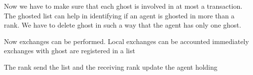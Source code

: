 \documentclass{article}
\begin{document}
Now we have to make sure that each ghost is involved in at most a
transaction. The ghosted list can help in identifying if an agent is
ghosted in more than a rank. We have to delete ghost in such a way that
the agent has only one ghost.

Now exchanges can be performed. Local exchanges can be accounted
immediately exchanges with ghost are registered in a list

The rank send the list and the receiving rank update the agent holding
\end{document}
